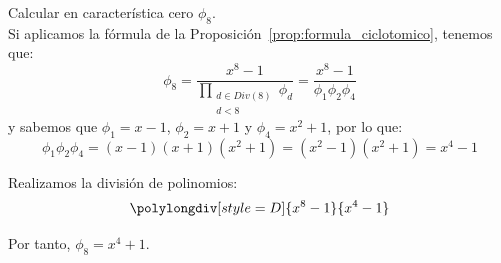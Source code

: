 \begin{ejercicio}
    Calcular en característica cero $\phi_8$.\\

    \noindent
    Si aplicamos la fórmula de la Proposición~\ref{prop:formula_ciclotomico}, tenemos que:
    \begin{equation*}
        \phi_8 = \frac{x^8-1}{\prod\limits_{\substack{d\in Div(8)\\ d < 8}} \phi_d} = \frac{x^8-1}{\phi_1\phi_2\phi_4}
    \end{equation*}
    y sabemos que $\phi_1 = x-1$, $\phi_2=x+1$ y $\phi_4 = x^2+1$, por lo que:
    \begin{equation*}
        \phi_1\phi_2\phi_4 = (x-1)(x+1)(x^2+1) = (x^2-1)(x^2+1) = x^4-1
    \end{equation*}

    Realizamos la división de polinomios:
    \begin{equation*}
        \polylongdiv[style=D]{x^8-1}{x^4-1}
    \end{equation*}

    Por tanto, $\phi_8 = x^4+1$.
\end{ejercicio}

